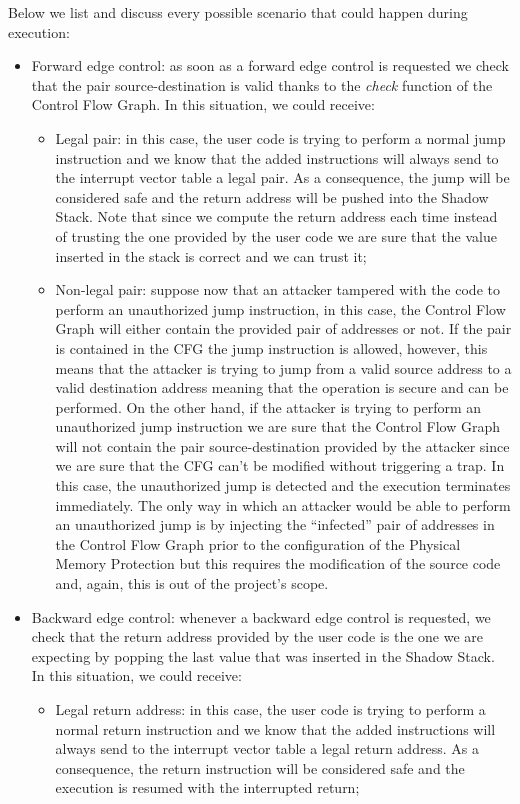 Below we list and discuss every possible scenario that could happen during execution:
\begin{itemize}
  \item Forward edge control: as soon as a forward edge control is requested we
    check that the pair source-destination is valid thanks to the \textit{check}
    function of the Control Flow Graph. In this situation, we could receive:
    \begin{itemize}
      \item Legal pair: in this case, the user code is trying to perform a normal
        jump instruction and we know that the added instructions will always send
        to the interrupt vector table a legal pair. As a consequence, the jump will
        be considered safe and the return address will be pushed into the Shadow
        Stack. Note that since we compute the return address each time instead
        of trusting the one provided by the user code we are sure that the value
        inserted in the stack is correct and we can trust it;

      \item Non-legal pair: suppose now that an attacker tampered with the code
        to perform an unauthorized jump instruction, in this case, the Control
        Flow Graph will either contain the provided pair of addresses or not. If
        the pair is contained in the CFG the jump instruction is allowed,
        however, this means that the attacker is trying to jump from a valid source
        address to a valid destination address meaning that the operation is secure
        and can be performed. On the other hand, if the attacker is trying to perform
        an unauthorized jump instruction we are sure that the Control Flow Graph
        will not contain the pair source-destination provided by the attacker since
        we are sure that the CFG can't be modified without triggering a trap. In
        this case, the unauthorized jump is detected and the execution terminates
        immediately. The only way in which an attacker would be able to perform
        an unauthorized jump is by injecting the ``infected'' pair of addresses
        in the Control Flow Graph prior to the configuration of the Physical
        Memory Protection but this requires the modification of the source code
        and, again, this is out of the project's scope.
    \end{itemize}

  \item Backward edge control: whenever a backward edge control is requested, we
    check that the return address provided by the user code is the one we are expecting
    by popping the last value that was inserted in the Shadow Stack. In this
    situation, we could receive:
    \begin{itemize}
      \item Legal return address: in this case, the user code is trying to perform
        a normal return instruction and we know that the added instructions will
        always send to the interrupt vector table a legal return address. As a
        consequence, the return instruction will be considered safe and the execution
        is resumed with the interrupted return;


\end{itemize}
\end{itemize}
